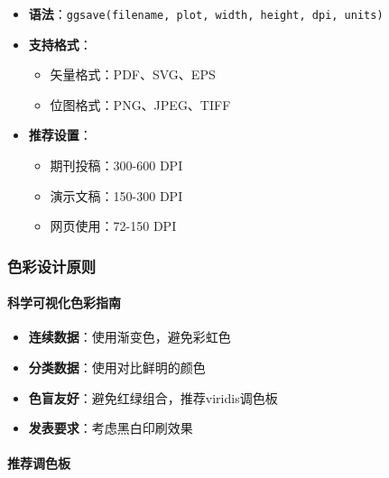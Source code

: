 \documentclass[
  twoside]{book}
\providecommand{\tightlist}{%
  \setlength{\itemsep}{0pt}\setlength{\parskip}{0pt}}
\begin{document}
\begin{itemize}
\tightlist
\item
  \textbf{语法}：\texttt{ggsave(filename,\ plot,\ width,\ height,\ dpi,\ units)}
\item
  \textbf{支持格式}：

  \begin{itemize}
  \tightlist
  \item
    矢量格式：PDF、SVG、EPS
  \item
    位图格式：PNG、JPEG、TIFF
  \end{itemize}
\item
  \textbf{推荐设置}：

  \begin{itemize}
  \tightlist
  \item
    期刊投稿：300-600 DPI
  \item
    演示文稿：150-300 DPI
  \item
    网页使用：72-150 DPI
  \end{itemize}
\end{itemize}

\hypertarget{ux8272ux5f69ux8bbeux8ba1ux539fux5219}{%
\subsubsection{色彩设计原则}\label{ux8272ux5f69ux8bbeux8ba1ux539fux5219}}

\hypertarget{ux79d1ux5b66ux53efux89c6ux5316ux8272ux5f69ux6307ux5357}{%
\paragraph{科学可视化色彩指南}\label{ux79d1ux5b66ux53efux89c6ux5316ux8272ux5f69ux6307ux5357}}

\begin{itemize}
\tightlist
\item
  \textbf{连续数据}：使用渐变色，避免彩虹色
\item
  \textbf{分类数据}：使用对比鲜明的颜色
\item
  \textbf{色盲友好}：避免红绿组合，推荐viridis调色板
\item
  \textbf{发表要求}：考虑黑白印刷效果
\end{itemize}

\hypertarget{ux63a8ux8350ux8c03ux8272ux677f}{%
\paragraph{推荐调色板}\label{ux63a8ux8350ux8c03ux8272ux677f}}
\end{document}
